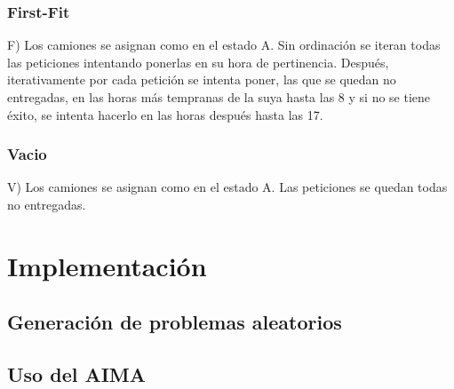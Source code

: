 \documentclass{article}
\begin{document}
\subsubsection{First-Fit}
F) Los camiones se asignan como en el estado A. Sin ordinación se iteran todas las peticiones intentando ponerlas en su hora de pertinencia. Después, iterativamente por cada petición se intenta poner, las que se quedan no entregadas, en las horas más tempranas de la suya hasta las 8 y si no se tiene éxito, se intenta hacerlo en las horas después hasta las 17.

\subsubsection{Vacio}
V) Los camiones se asignan como en el estado A. Las peticiones se quedan todas no entregadas.

\newpage
\section{Implementación}

\subsection{Generación de problemas aleatorios}

\subsection{Uso del AIMA}
\end{document}
